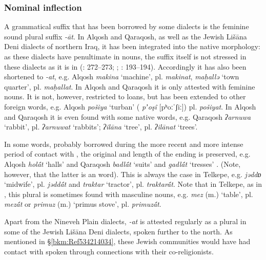 \documentclass[output=paper]{langsci/langscibook}
\begin{document}
\subsubsection{\label{bkm:Ref534226861}Nominal inflection}

A grammatical suffix that has been borrowed by some  dialects is the  feminine sound plural suffix \textit{{}-āt}. In  Alqosh and  Qaraqosh, as well as the Jewish Lišāna Deni dialects of northern Iraq, it has been integrated into the native morphology: as these dialects have penultimate  in nouns, the suffix itself is not stressed in these dialects as it is in  (\citealt{Coghill2004}: 272–273; \citeyear{Coghill2005}; \citealt{Khan2002}: 193–194). Accordingly it has also been shortened to \textit{\nobreakdash-at}, e.g.  Alqosh \textit{makina} ‘machine’, pl. \textit{makinat}, \textit{maḥallə} ‘town quarter’, pl. \textit{maḥallat}. In Alqosh and Qaraqosh it is only attested with feminine nouns. It is not, however, restricted to  loans, but has been extended to other foreign words, e.g. Alqosh \textit{pošiya} ‘turban’ ( \textit{pʼoşî} [pʰoːˈʃiː]) pl. \textit{pošiyat}. In Alqosh and Qaraqosh it is even found with some native  words, e.g.  Qaraqosh \textit{ʔarnuwa} ‘rabbit’, pl. \textit{ʔarnuwat} ‘rabbits’; \textit{ʔilāna} ‘tree’, pl. \textit{ʔilānat} ‘trees’.

In some words, probably borrowed during the more recent and more intense period of contact with , the original  and length of the ending is preserved, e.g.  Alqosh \textit{hol\'{ā}t} ‘halls’ and  Qaraqosh \textit{badl\'{ā}t} ‘suits’ and \textit{gadl\'{ā}t} ‘tresses’ \citep[194]{Khan2002}. (Note, however, that the latter is an  word). This is always the case in Telkepe, e.g. \textit{jəddɒ} ‘midwife’, pl. \textit{jədd\'{ā}t} and \textit{traktar} ‘tractor’, pl. \textit{traktar\'{ā}t}. Note that in Telkepe, as in , this plural is sometimes found with masculine nouns, e.g. \textit{mez} (m.) ‘table’, pl. \textit{mez\'{ā}t} or \textit{primuz} (m.) ‘primus stove’, pl. \textit{primuz\'{ā}t}.

Apart from the  Nineveh Plain dialects, \textit{\nobreakdash-at} is attested regularly as a plural in some of the Jewish Lišāna Deni dialects, spoken further to the north. As mentioned in §\ref{bkm:Ref534214034}, these Jewish communities would have had contact with spoken  through connections with their co-religionists.
\end{document}
